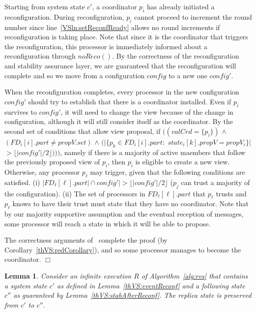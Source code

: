 \documentclass[11pt]{article}
\newcommand{\rep}{state}
\newcommand{\noReconfig}{noReco}
\newtheorem{lemma}[theorem]{Lemma}
\newenvironment{proof}{\noindent{\bf Proof.}}{\hfill$\Box$}
\begin{document}
\begin{proof}
Starting from system state $c'$, a coordinator $p_i$ has already initiated a reconfiguration.
During reconfiguration, $p_i$ cannot proceed to increment the round number since line~\ref{VSln:setReconfReady} allows no round increments if reconfiguration is taking place.
Note that since it is the coordinator that triggers the reconfiguration, this processor is immediately informed about a reconfiguration through $\noReconfig()$.
By the correctness of the reconfiguration and stability assurance layer, we are guaranteed that the reconfiguration will complete and so we move from a configuration $config$ to a new one $config'$.

When the reconfiguration completes, every processor in the new configuration $config'$ should try to establish that there is a coordinator installed.
Even if $p_i$ survives to $config'$, it will need to change the view because of the change in configuration, although it will still consider itself as the coordinator.
By the second set of conditions that allow view proposal, if $((valCrd = \{p_i\})$ $\land$ $(FD_i[i].part \neq propV.set)$ $\land $
$(|\{p_k\in FD_i[i].part:$ $\rep_i[k].propV = propV_i\}|$ $> \lfloor |config'|/2 \rfloor)))$, namely if there is a majority of active maembers that follow the previously proposed view of $p_i$, then $p_i$ is eligible to create a new view.
Otherwise, any processor $p_\ell$ may trigger, given that the following conditions are satisfied. 
(i) $|FD_\ell[\ell].part|\cap config'| > \lfloor |config'|/2\rfloor $ ($p_j$ can trust a majority of the configuration).
(ii) The set of processors in $FD_\ell[\ell].part$ that $p_\ell$ trusts and $p_\ell$ knows to have their trust must state that they have no coordinator.
Note that by our majority supportive assumption and the eventual reception of messages, some processor will reach a state in which it will be able to propose.

The correctness arguments of~\cite{SSVS} complete the proof (by Corollary~\ref{thVS:redCorollary}), and so some processor manages to become the coordinator.
\end{proof}

\begin{lemma}
Consider an infinite execution $R$ of Algorithm~\ref{alg:rvs} that contains a system state $c'$ as defined in Lemma~\ref{thVS:eventReconf} and a following state $c''$ as guaranteed by Lemma~\ref{thVS:stabAfterReconf}. 
The replica state is preserved from $c'$ to $c''$.
\end{lemma}
\end{document}
